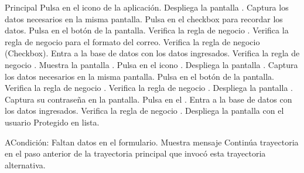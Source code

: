	\begin{UCtrayectoria}{Principal}
		\UCpaso[\UCactor] Pulsa en el icono de la aplicación.
		\UCpaso[\UCsist] Despliega la pantalla .
		\UCpaso[\UCactor] Captura los datos necesarios en la misma pantalla.
		\UCpaso[\UCactor] Pulsa en el checkbox para recordar los datos.
		\UCpaso[\UCactor] Pulsa en el botón  de la pantalla.
		\UCpaso[\UCsist] Verifica la regla de negocio . 
		\UCpaso[\UCsist] Verifica la regla de negocio   para el formato del correo. 
		\UCpaso[\UCsist] Verifica la regla de negocio (Checkbox). 
		\UCpaso[\UCsist] Entra a la base de datos con los datos ingresados. 
		\UCpaso[\UCsist] Verifica la regla de negocio . 
		\UCpaso[\UCsist] Muestra la pantalla .
		\UCpaso[\UCactor] Pulsa en el icono .
		\UCpaso[\UCsist] Despliega la pantalla .
		\UCpaso[\UCactor] Captura los datos necesarios en la misma pantalla.
		\UCpaso[\UCactor] Pulsa en el botón  de la pantalla.
		\UCpaso[\UCsist] Verifica la regla de negocio . 
		\UCpaso[\UCsist] Verifica la regla de negocio . 
		\UCpaso[\UCsist] Despliega la pantalla .
		\UCpaso[\UCactor] Captura su contraseña en la pantalla.
		\UCpaso[\UCactor] Pulsa en el  .
		\UCpaso[\UCsist] Entra a la base de datos con los datos ingresados.  
		\UCpaso[\UCsist] Verifica la regla de negocio . 
		\UCpaso[\UCsist] Despliega la pantalla  con el usuario Protegido en lista.
	\end{UCtrayectoria}
	\begin{UCtrayectoriaA}{A}{Condición: Faltan datos en el formulario.}
		\UCpaso[\UCsist] Muestra mensaje 
		\UCpaso[\UCsist] Continúa trayectoria en el paso anterior de la trayectoria  principal que invocó esta trayectoria alternativa. 
	\end{UCtrayectoriaA}
